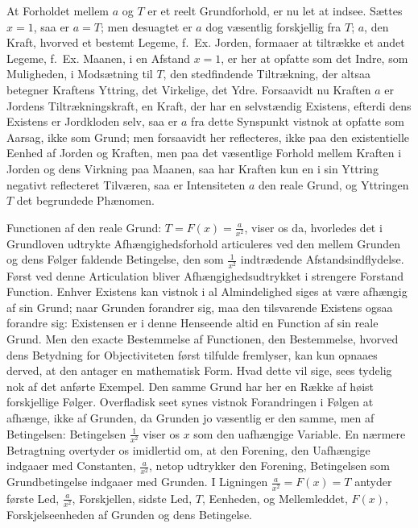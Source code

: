 \documentclass[12pt]{book}
\newcommand{\opage}[1]{\marginnote{\footnotesize\textit{[#1]}}}
\begin{document}
At Forholdet mellem $a$ og $T$ er et reelt Grundforhold,
\opage{314} er nu let at indsee. Sættes $x = 1$, saa er $a = T$; men desuagtet er $a$ dog væsentlig forskjellig fra
$T$; $a$, den Kraft, hvorved et bestemt Legeme, f.\ Ex. Jorden, formaaer at tiltrække et andet Legeme,
f.\ Ex. Maanen, i en Afstand $x = 1$, er her at opfatte som det Indre, som Muligheden, i Modsætning til
$T$, den stedfindende Tiltrækning, der altsaa betegner Kraftens Yttring, det Virkelige, det Ydre.
Forsaavidt nu Kraften $a$ er Jordens Tiltrækningskraft, en Kraft, der har en selvstændig Existens,
efterdi dens Existens er Jordkloden selv, saa er $a$ fra dette Synspunkt vistnok at opfatte som Aarsag,
ikke som Grund; men forsaavidt her reflecteres, ikke paa den existentielle Eenhed af Jorden og Kraften,
men paa det væsentlige Forhold mellem Kraften i Jorden og dens Virkning paa Maanen, saa har Kraften kun
en i sin Yttring negativt reflecteret Tilværen, saa er Intensiteten $a$ den reale Grund, og Yttringen
$T$ det begrundede Phænomen.

Functionen af den reale Grund: $T = F(x) = \frac{a}{x^{2}}$, viser os da, hvorledes det i Grundloven
udtrykte Afhængighedsforhold articuleres ved den mellem Grunden og dens Følger faldende Betingelse, den
som $\frac{1}{x^{2}}$ indtrædende Afstandsindflydelse. Først ved denne Articulation bliver
Afhængighedsudtrykket i strengere Forstand Function. Enhver Existens kan vistnok i al Almindelighed siges
at være afhængig af sin Grund; naar Grunden forandrer sig, maa den tilsvarende Existens ogsaa forandre
sig: Existensen er i denne Henseende altid en Function af sin reale Grund. Men den exacte Bestemmelse af
Functionen, den Bestemmelse, hvorved dens Betydning for Objectiviteten først tilfulde fremlyser, kan kun
opnaaes derved, at den antager en mathematisk Form. Hvad dette vil sige, sees tydelig nok af det anførte
Exempel. Den samme Grund har her en Række af høist forskjellige Følger. Overfladisk seet synes vistnok
Forandringen i Følgen
\opage{315} at afhænge, ikke af Grunden, da Grunden jo væsentlig er den samme, men af Betingelsen: Betingelsen
$\frac{1}{x^{2}}$ viser os $x$ som den uafhængige Variable. En nærmere Betragtning overtyder os
imidlertid om, at den Forening, den Uafhængige indgaaer med Constanten, $\frac{a}{x^{2}}$, netop
udtrykker den Forening, Betingelsen som Grundbetingelse indgaaer med Grunden. I Ligningen
$\frac{a}{x^{2}} = F(x) = T$ antyder første Led, $\frac{a}{x^{2}}$, Forskjellen, sidste Led, $T$,
Eenheden, og Mellemleddet, $F(x)$, Forskjelseenheden af Grunden og dens Betingelse.
\end{document}
